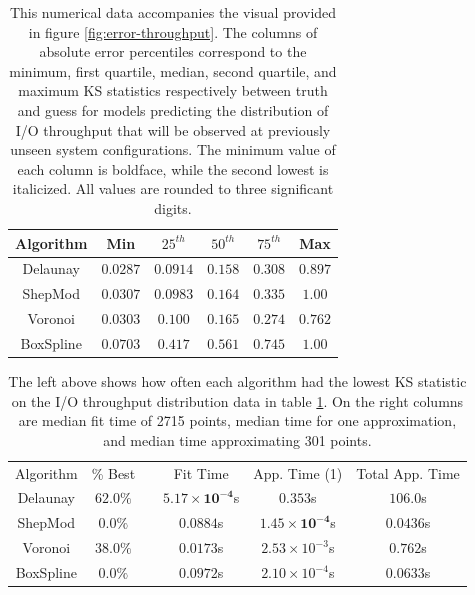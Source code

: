 \documentclass[smallextended,final]{svjour3}       %
\begin{document}
\begin{appendix}
\begin{table}
  \centering
  \begin{tabular}{c|c|c|c|c|c}
    \hline
    Algorithm & Min & $25^{th}$ & $50^{th}$ & $75^{th}$ & Max\\
    \hline
    Delaunay & $\mathbf{0.0287}$ & $\mathbf{0.0914}$ & $\mathbf{0.158}$ & $\mathit{0.308}$ & $\mathit{0.897}$\\
    ShepMod & $0.0307$ & $\mathit{0.0983}$ & $\mathit{0.164}$ & $0.335$ & $1.00$\\
    Voronoi & $\mathit{0.0303}$ & $0.100$ & $0.165$ & $\mathbf{0.274}$ & $\mathbf{0.762}$\\
    BoxSpline & $0.0703$ & $0.417$ & $0.561$ & $0.745$ & $1.00$\\
    \hline
  \end{tabular}
  \caption{This numerical data accompanies the visual provided in
    figure \ref{fig:error-throughput}. The columns of absolute error
    percentiles correspond to the minimum, first quartile, median,
    second quartile, and maximum KS statistics respectively between
    truth and guess for models predicting the distribution of I/O
    throughput that will be observed at previously unseen system
    configurations. The minimum value of each column is boldface,
    while the second lowest is italicized. All values are rounded to
    three significant digits.}
  \label{table:error-throughput}
\end{table}

\begin{table}
  \centering
  \begin{tabular}{|c|c| c |c|c|c|}
    \cline{1-2}\cline{4-6}
    Algorithm & \% Best &  & Fit Time & App. Time (1) & Total App. Time\\
    \cline{1-2}\cline{4-6}
    Delaunay & $\mathbf{62.0}\%$ &  & $\mathbf{5.17 \times 10^{-4}}$s & $0.353$s & $106.0$s\\
    ShepMod & $0.0\%$ &  & $0.0884$s & $\mathbf{1.45 \times 10^{-4}}$s & $\mathbf{0.0436}$s\\
    Voronoi & $\mathit{38.0}\%$ &  & $\mathit{0.0173}$s & $2.53 \times 10^{-3}$s & $0.762$s\\
    BoxSpline & $0.0\%$ &  & $0.0972$s & $\mathit{2.10 \times 10^{-4}}$s & $\mathit{0.0633}$s\\
    \cline{1-2}\cline{4-6}
  \end{tabular}
  \caption{The left above shows how often each algorithm had the
    lowest KS statistic on the I/O throughput distribution data in
    table \ref{table:error-throughput}. On the right columns are
    median fit time of 2715 points, median time for one approximation,
    and median time approximating 301 points.}
  \label{table:best-throughput}
\end{table}


\end{appendix}
\end{document}
